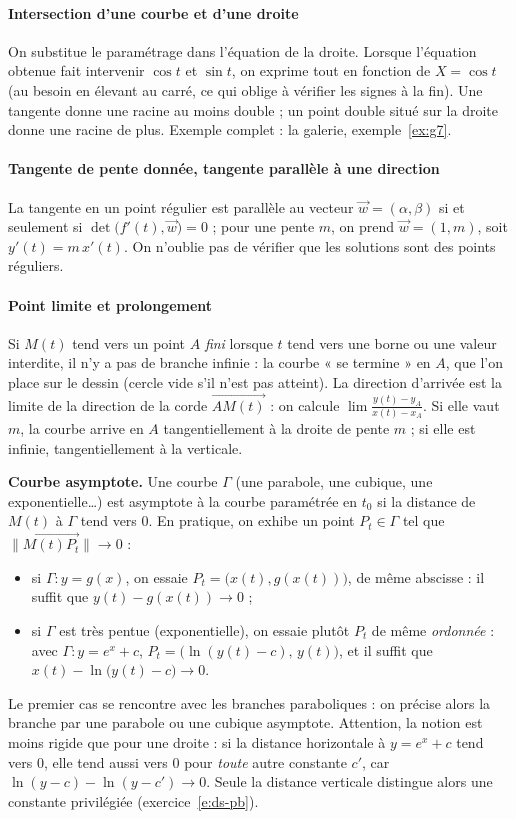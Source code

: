 \documentclass[a4paper,11pt]{article}
\numberwithin{equation}{section}
\numberwithin{figure}{section}
\numberwithin{table}{section}
\theoremstyle{enonce}
\theoremstyle{exemple}
\theoremstyle{remarque}
\newcommand{\vv}[1]{\overrightarrow{#1}}
\newcommand{\ve}[1]{\vec{#1}}
\begin{document}
\paragraph{Intersection d'une courbe et d'une droite} On substitue le paramétrage dans l'équation de la droite. Lorsque
l'équation obtenue fait intervenir $\cos t$ et $\sin t$, on exprime tout en fonction de $X=\cos t$ (au besoin en élevant au
carré, ce qui oblige à vérifier les signes à la fin). Une tangente donne une racine au moins double ; un point double
situé sur la droite donne une racine de plus. Exemple complet : la galerie, exemple~\ref{ex:g7}.

\paragraph{Tangente de pente donnée, tangente parallèle à une direction} La tangente en un point régulier est parallèle
au vecteur $\ve w=(\alpha,\beta)$ si et seulement si $\det\big(f'(t),\ve w\big)=0$ ; pour une pente $m$, on prend
$\ve w=(1,m)$, soit $y'(t)=m\,x'(t)$. On n'oublie pas de vérifier que les solutions sont des points réguliers.

\paragraph{Point limite et prolongement} Si $M(t)$ tend vers un point $A$ \emph{fini} lorsque $t$ tend vers une borne ou
une valeur interdite, il n'y a pas de branche infinie : la courbe « se termine » en $A$, que l'on place sur le dessin
(cercle vide s'il n'est pas atteint). La direction d'arrivée est la limite de la direction de la corde $\vv{AM(t)}$ :
on calcule $\lim\frac{y(t)-y_A}{x(t)-x_A}$. Si elle vaut $m$, la courbe arrive en $A$ tangentiellement à la droite de pente
$m$ ; si elle est infinie, tangentiellement à la verticale.

\begin{horsprogramme}\label{hp:courbe-asymptote}
\textbf{Courbe asymptote.} Une courbe $\Gamma$ (une parabole, une cubique, une exponentielle\dots) est asymptote à la
courbe paramétrée en $t_0$ si la distance de $M(t)$ à $\Gamma$ tend vers $0$. En pratique, on exhibe un point
$P_t\in\Gamma$ tel que $\|\vv{M(t)P_t}\|\to0$ :
\begin{itemize}
\item si $\Gamma:y=g(x)$, on essaie $P_t=\big(x(t),g(x(t))\big)$, de même abscisse : il suffit que $y(t)-g(x(t))\to0$ ;
\item si $\Gamma$ est très pentue (exponentielle), on essaie plutôt $P_t$ de même \emph{ordonnée} : avec
      $\Gamma:y=e^x+c$, $P_t=\big(\ln(y(t)-c),\,y(t)\big)$, et il suffit que $x(t)-\ln\big(y(t)-c\big)\to0$.
\end{itemize}
Le premier cas se rencontre avec les branches paraboliques : on précise alors la branche par une parabole ou une cubique
asymptote. Attention, la notion est moins rigide que pour une droite : si la distance horizontale à $y=e^x+c$ tend vers
$0$, elle tend aussi vers $0$ pour \emph{toute} autre constante $c'$, car $\ln(y-c)-\ln(y-c')\to0$. Seule la distance
verticale distingue alors une constante privilégiée (exercice~\ref{e:ds-pb}).
\end{horsprogramme}
\end{document}
